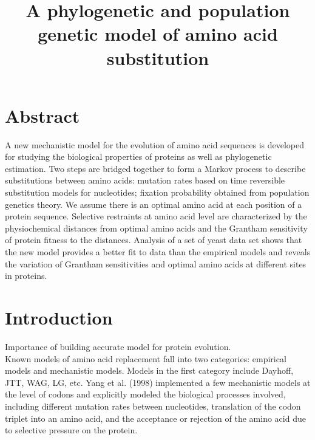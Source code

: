 \documentclass[13pt]{article}
\title{A phylogenetic and population genetic model of amino acid substitution}
\author{}
\begin{document}
\maketitle
\section{Abstract}
A new mechanistic model for the evolution of amino acid sequences is developed for studying the biological properties of proteins as well as phylogenetic estimation.  Two steps are bridged together to form a Markov process to describe substitutions between amino acids: mutation rates based on time reversible substitution models for nucleotides; fixation probability obtained from population genetics theory. We assume there is an optimal amino acid at each position of a protein sequence. Selective restraints at amino acid level are characterized by the physiochemical distances from optimal amino acids and the Grantham sensitivity of protein fitness to the distances. Analysis of a set of yeast data set shows that the new model provides a better fit to data than the empirical models and reveals the variation of Grantham sensitivities and optimal amino acids at different sites in proteins.\\

\section{Introduction}
Importance of building accurate model for protein evolution. \\

Known models of amino acid replacement fall into two categories: empirical models and mechanistic models. Models in the first category include Dayhoff, JTT, WAG, LG, etc. Yang et al. (1998) implemented a few mechanistic models at the level of codons and explicitly modeled the biological processes involved, including different mutation rates between nucleotides, translation of the codon triplet into an amino acid, and the acceptance or rejection of the amino acid due to selective pressure on the protein. \\
\end{document}
